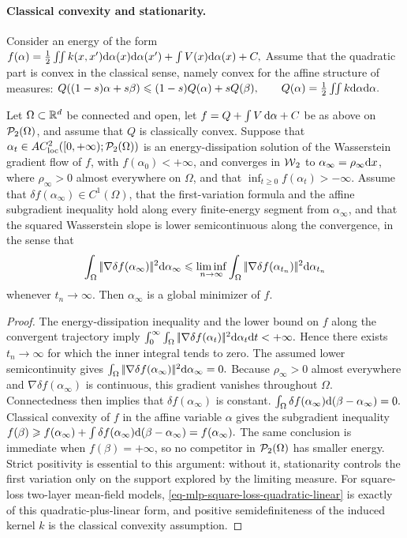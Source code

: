 \paragraph{Classical convexity and stationarity.}
Consider an energy of the form
\(f(\alpha) = \frac12\iint k(x,x')\mathrm{d}\alpha(x)\mathrm{d}\alpha(x') + \int V(x)\mathrm{d}\alpha(x) +C,\)
Assume that the quadratic part is convex in the classical sense, namely convex for the affine structure of measures: \(Q((1-s)\alpha+s\beta)\leqslant (1-s)Q(\alpha)+sQ(\beta), \qquad Q(\alpha)=\frac12\iint k\mathrm{d}\alpha\mathrm{d}\alpha.\)
\begin{prop}\label{prop-classical-convex-stationary}
Let $\Omega\subset\mathbb{R}^d$ be connected and open, let $f=Q+\int V\,\mathrm{d}\alpha+C$ be as above on $\mathcal{P}_2(\Omega)$, and assume that $Q$ is classically convex. Suppose that $\alpha_t\in AC^2_{\mathrm{loc}}([0,+\infty);\mathcal{P}_2(\Omega))$ is an energy-dissipation solution of the Wasserstein gradient flow of $f$, with $f(\alpha_0)<+\infty$, and converges in $\operatorname{\mathcal{W}}_2$ to $\alpha_\infty=\rho_\infty\mathrm{d} x$, where $\rho_\infty>0$ almost everywhere on $\Omega$, and that $\inf_{t\geq0}f(\alpha_t)>-\infty$. Assume that $\delta f(\alpha_\infty)\in C^1(\Omega)$, that the first-variation formula and the affine subgradient inequality hold along every finite-energy segment from $\alpha_\infty$, and that the squared Wasserstein slope is lower semicontinuous along the convergence, in the sense that
\[
\int_\Omega|\!| \nabla\delta f(\alpha_\infty) |\!|^2\mathrm{d}\alpha_\infty
\leqslant
\liminf_{n\to\infty}
\int_\Omega|\!| \nabla\delta f(\alpha_{t_n}) |\!|^2\mathrm{d}\alpha_{t_n}
\]
whenever $t_n\to\infty$. Then $\alpha_\infty$ is a global minimizer of $f$.
\end{prop}
\begin{proof}
The energy-dissipation inequality and the lower bound on $f$ along the convergent trajectory imply
\(\int_0^\infty \int_\Omega|\!| \nabla\delta f(\alpha_t) |\!|^2\mathrm{d}\alpha_t\mathrm{d} t <+\infty.\)
Hence there exists $t_n\to\infty$ for which the inner integral tends to zero. The assumed lower semicontinuity gives \(\int_\Omega |\!| \nabla \delta f(\alpha_\infty) |\!|^2\mathrm{d}\alpha_\infty=0.\)
Because $\rho_\infty>0$ almost everywhere and $\nabla\delta f(\alpha_\infty)$ is continuous, this gradient vanishes throughout $\Omega$. Connectedness then implies that $\delta f(\alpha_\infty)$ is constant.
\(\int_\Omega\delta f(\alpha_\infty)\mathrm{d}(\beta-\alpha_\infty)=0.\)
Classical convexity of $f$ in the affine variable $\alpha$ gives the subgradient inequality
\(f(\beta)\geqslant f(\alpha_\infty) + \int \delta f(\alpha_\infty)\mathrm{d}(\beta-\alpha_\infty) = f(\alpha_\infty).\)
The same conclusion is immediate when $f(\beta)=+\infty$, so no competitor in $\mathcal{P}_2(\Omega)$ has smaller energy. Strict positivity is essential to this argument: without it, stationarity controls the first variation only on the support explored by the limiting measure. For square-loss two-layer mean-field models, \eqref{eq-mlp-square-loss-quadratic-linear} is exactly of this quadratic-plus-linear form, and positive semidefiniteness of the induced kernel $k$ is the classical convexity assumption.
\end{proof}
